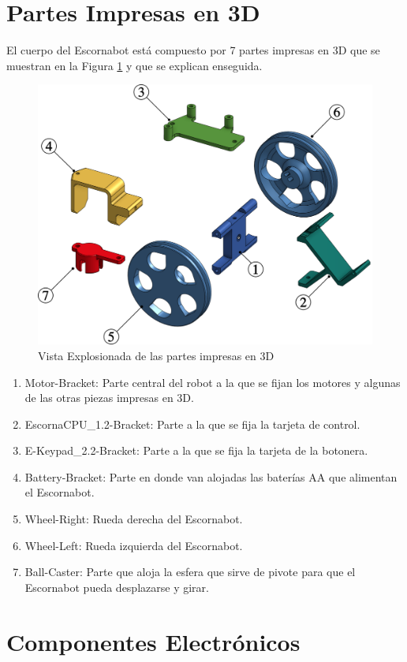 \documentclass{article}
\begin{document}
\section{Partes Impresas en 3D}
El cuerpo del Escornabot está compuesto por 7 partes impresas en 3D que se muestran en la Figura \ref{fig:exploded_view_1} y que se explican enseguida.

\begin{figure}[H]
    \centering
    \includegraphics[width=0.8\columnwidth]{images/3DParts/Exploded_view_1.png}
    \caption{Vista Explosionada de las partes impresas en 3D}
    \label{fig:exploded_view_1}
\end{figure}

\begin{enumerate}
    \item Motor-Bracket: Parte central del robot a la que se fijan los motores y algunas de las otras piezas impresas en 3D.
    \item EscornaCPU\_1.2-Bracket: Parte a la que se fija la tarjeta de control.
    \item E-Keypad\_2.2-Bracket: Parte a la que se fija la tarjeta de la botonera.
    \item Battery-Bracket: Parte en donde van alojadas las baterías AA que alimentan el Escornabot.
    \item Wheel-Right: Rueda derecha del Escornabot.
    \item Wheel-Left: Rueda izquierda del Escornabot.
    \item Ball-Caster: Parte que aloja la esfera que sirve de pivote para que el Escornabot pueda desplazarse y girar.
\end{enumerate}

\section{Componentes Electrónicos}
\end{document}
